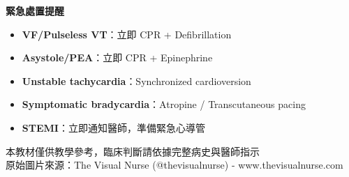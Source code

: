 \documentclass[12pt,a4paper]{article}
\begin{document}
\begin{center}
\end{center}

\vspace{1cm}

\begin{importantbox}
\textbf{緊急處置提醒}
\begin{itemize}[leftmargin=*]
    \item \textcolor{emergency_red}{\textbf{VF/Pulseless VT}}：立即 CPR + Defibrillation
    \item \textcolor{emergency_red}{\textbf{Asystole/PEA}}：立即 CPR + Epinephrine
    \item \textcolor{emergency_red}{\textbf{Unstable tachycardia}}：Synchronized cardioversion
    \item \textcolor{emergency_red}{\textbf{Symptomatic bradycardia}}：Atropine / Transcutaneous pacing
    \item \textcolor{emergency_red}{\textbf{STEMI}}：立即通知醫師，準備緊急心導管
\end{itemize}
\end{importantbox}

\vfill
\begin{center}
\textcolor{emergency_gray}{\small 本教材僅供教學參考，臨床判斷請依據完整病史與醫師指示}\\
\textcolor{emergency_gray}{\small 原始圖片來源：The Visual Nurse (@thevisualnurse) - www.thevisualnurse.com}
\end{center}
\end{document}
